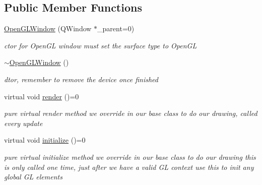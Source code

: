 \subsection*{Public Member Functions}
\begin{DoxyCompactItemize}
\item 
\hyperlink{class_open_g_l_window_a2fd92afd17361a60e058dc5433c316af}{Open\+G\+L\+Window} (Q\+Window $\ast$\+\_\+parent=0)
\begin{DoxyCompactList}\small\item\em ctor for Open\+G\+L window must set the surface type to Open\+G\+L \end{DoxyCompactList}\item 
\hypertarget{class_open_g_l_window_aa220b192c71871aab9100f4058a8d62d}{}\hyperlink{class_open_g_l_window_aa220b192c71871aab9100f4058a8d62d}{$\sim$\+Open\+G\+L\+Window} ()\label{class_open_g_l_window_aa220b192c71871aab9100f4058a8d62d}

\begin{DoxyCompactList}\small\item\em dtor, remember to remove the device once finished \end{DoxyCompactList}\item 
\hypertarget{class_open_g_l_window_a0e0194a4f0a30af7249819094c7d1d35}{}virtual void \hyperlink{class_open_g_l_window_a0e0194a4f0a30af7249819094c7d1d35}{render} ()=0\label{class_open_g_l_window_a0e0194a4f0a30af7249819094c7d1d35}

\begin{DoxyCompactList}\small\item\em pure virtual render method we override in our base class to do our drawing, called every update \end{DoxyCompactList}\item 
\hypertarget{class_open_g_l_window_a00b6a24198503b88aea4c5a995723db2}{}virtual void \hyperlink{class_open_g_l_window_a00b6a24198503b88aea4c5a995723db2}{initialize} ()=0\label{class_open_g_l_window_a00b6a24198503b88aea4c5a995723db2}

\begin{DoxyCompactList}\small\item\em pure virtual initialize method we override in our base class to do our drawing this is only called one time, just after we have a valid G\+L context use this to init any global G\+L elements \end{DoxyCompactList}\end{DoxyCompactItemize}
